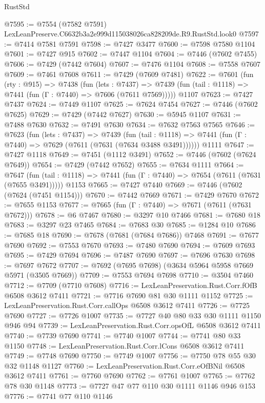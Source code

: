 \begin{lexlean}{RustStd}
\begin{coremodule}
@7595 := @7554 (@7582 @7591) LexLeanPreserve.C6632b3a2e999d115038026ca828209de.R9.RustStd.look0
@7597 := @7414 @7581 @7591
@7598 := @7427 @3477
@7600 := @7598 @7580 @1104
@7601 := @7427 @915
@7602 := @7447 @1104
@7604 := @7446 (@7602 @7455)
@7606 := @7429 (@7442 @7604)
@7607 := @7476 @1104
@7608 := @7558 @7607
@7609 := @7461 @7608
@7611 := @7429 (@7609 @7481)
@7622 := @7601
    (fun (rty : @915) =>
    @7438
      (fun (lets : @7437) =>
      @7439 (fun (tail : @1118) => @7441 (fun (Γ : @7440) => @7606 (@7611 @7569)))))
    @1107
@7623 := @7427 @7437
@7624 := @7449 @1107
@7625 := @7624 @7454
@7627 := @7446 (@7602 @7625)
@7629 := @7429 (@7442 @7627)
@7630 := @5945 @1107
@7631 := @7488 @7630
@7632 := @7491 @7630
@7634 := @7632 @7563 @7565
@7646 := @7623
    (fun (lets : @7437) =>
    @7439
      (fun (tail : @1118) => @7441 (fun (Γ : @7440) => @7629 (@7611 (@7631 (@7634 @3488 @3491))))))
    @1111
@7647 := @7427 @1118
@7649 := @7451 (@1112 @3491)
@7652 := @7446 (@7602 (@7624 @7649))
@7654 := @7429 (@7442 @7652)
@7655 := @7634 @1111
@7664 := @7647
    (fun (tail : @1118) => @7441 (fun (Γ : @7440) => @7654 (@7611 (@7631 (@7655 @3491)))))
    @1153
@7665 := @7427 @7440
@7669 := @7446 (@7602 (@7624 (@7451 @1154)))
@7670 := @7442 @7669
@7671 := @7429 @7670
@7672 := @7655 @1153
@7677 := @7665 (fun (Γ : @7440) => @7671 (@7611 (@7631 @7672)))
@7678 := @6 @7467
@7680 := @3297 @10 @7466
@7681 := @7680 @18
@7683 := @3297 @23 @7465
@7684 := @7683 @30
@7685 := @1284 @10
@7686 := @7685 @18
@7690 := @7678 (@7681 (@7684 @7686)) @7468
@7691 := @7677 @7690
@7692 := @7553 @7670
@7693 := @7480 @7690
@7694 := @7609 @7693
@7695 := @7429 @7694
@7696 := @7487 @7690
@7697 := @7696 @7630
@7698 := @7697 @7672
@7707 := @7692 (@7695 @7698) (@3634 @5964 @5958 @7669 @5971 (@3505 @7669))
@7709 := @7553 @7694 @7698
@7710 := @3504 @7460
@7712 := @7709 (@7710 @7608)
@7716 := LexLeanPreservation.Rust.Corr.fOfB @6508 @3612 @7411
@7721 := @7716 @7690 @81 @30 @1111 @1152
@7725 := LexLeanPreservation.Rust.Corr.callOps @6508 @3612 @7411
@7726 := @7725 @7690
@7727 := @7726 @1007
@7735 := @7727 @40 @80 @33 @30 @1111 @1150 @946 @94
@7739 := LexLeanPreservation.Rust.Corr.opsOfL @6508 @3612 @7411
@7740 := @7739 @7690
@7741 := @7740 @1007
@7744 := @7741 @80 @33 @1150
@7748 := LexLeanPreservation.Rust.Corr.lCons @6508 @3612 @7411
@7749 := @7748 @7690
@7750 := @7749 @1007
@7756 := @7750 @78 @55 @30 @32 @1148 @1127
@7760 := LexLeanPreservation.Rust.Corr.eOfBNil @6508 @3612 @7411
@7761 := @7760 @7690
@7762 := @7761 @1007
@7765 := @7762 @78 @30 @1148
@7773 := @7727 @47 @77 @110 @30 @1111 @1146 @946 @153
@7776 := @7741 @77 @110 @1146

\end{coremodule}
\end{lexlean}
